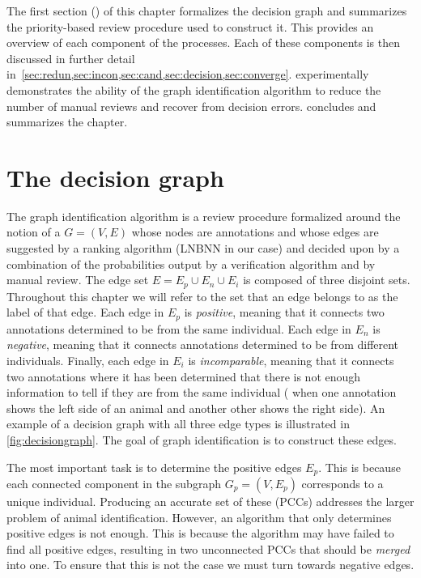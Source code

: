 The first section () of this chapter formalizes the decision graph and summarizes the
  priority-based review procedure used to construct it.
This provides an overview of each component of the processes.
Each of these components is then discussed in further detail
  in~\cref{sec:redun,sec:incon,sec:cand,sec:decision,sec:converge}.
 experimentally demonstrates the ability of the graph identification algorithm to reduce the
  number of manual reviews and recover from decision errors.
 concludes and summarizes the chapter.


\FloatBarrier{}
\section{The decision graph}\label{sec:decisiongraph}

The graph identification algorithm is a review procedure formalized around the notion of a  $G = (V, E)$ whose nodes are annotations and whose edges are suggested by a ranking algorithm (LNBNN in
  our case) and decided upon by a combination of the probabilities output by a verification algorithm and by manual
  review.
The edge set $E = E_p \cup E_n \cup E_i$ is composed of three disjoint sets.
Throughout this chapter we will refer to the set that an edge belongs to as the label of that edge.
Each edge in $E_p$ is \emph{positive}, meaning that it connects two annotations determined to be from the same
  individual.
Each edge in $E_n$ is \emph{negative}, meaning that it connects annotations determined to be from different
  individuals.
Finally, each edge in $E_i$ is \emph{incomparable}, meaning that it connects two annotations where it has been
  determined that there is not enough information to tell if they are from the same individual (\eg{} when one
  annotation shows the left side of an animal and another other shows the right side).
An example of a decision graph with all three edge types is illustrated in \cref{fig:decisiongraph}.
The goal of graph identification is to construct these edges.

\decisiongraph{}

The most important task is to determine the positive edges $E_p$.
This is because each connected component in the subgraph $G_p = (V, E_p)$ corresponds to a unique individual.
Producing an accurate set of these  (PCCs) addresses the larger problem
  of animal identification.
However, an algorithm that only determines positive edges is not enough.
This is because the algorithm may have failed to find all positive edges, resulting in two unconnected PCCs that
  should be \emph{merged} into one.
To ensure that this is not the case we must turn towards negative edges.

